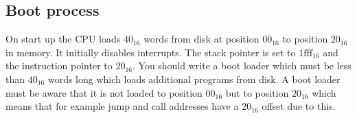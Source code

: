 \subsection{Boot process}

On start up the CPU loads $40_{16}$ words from disk at position $00_{16}$ to position $20_{16}$
in memory. It initially disables interrupts. The stack pointer is set to $\text{1fff}_{16}$ and the
instruction pointer to $20_{16}$. You should write a boot loader which must be less than $40_{16}$
words long which loads additional programs from disk. A boot loader must be aware that it is not
loaded to position $00_{16}$ but to position $20_{16}$ which means that for example jump and call
addresses have a $20_{16}$ offset due to this. 
